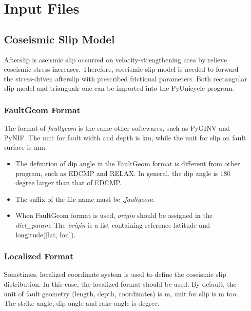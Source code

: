 \documentclass[UTF8,a4paper]{report}
\begin{document}
\chapter{Input Files}
\section{Coseismic Slip Model}
Afterslip is aseismic slip occurred on velocity-strengthening area by relieve coseismic stress increases. Therefore, coseismic slip model is needed to forward the stress-driven afterslip with prescribed frictional parameters. Both rectangular slip model and triangualr one can be imported into the PyUnicycle program.

\subsection{FaultGeom Format}
The format of \textit{faultgeom} is the same other softewares, such as PyGINV and PyNIF. The unit for fault width and depth is km, while the unit for slip on fault surface is mm.
\begin{center}
\end{center}

\begin{itemize}
\item The definition of dip angle in the FaultGeom format is different from other program, such as EDCMP and RELAX. In general, the dip angle is 180 degree larger than that of EDCMP.
\item The suffix of the file name must be \emph{.faultgeom}.
\item When FaultGeom format is used, \emph{origin} should be assigned in the \emph{dict\_param}. The \emph{origin} is a list containing reference latitude and longitude([lat, lon]).
\end{itemize}


\subsection{Localized Format}
Sometimes, localized coordinate system is used to define the coseismic slip distribution. In this case, the localized format should be used. By default, the unit of fault geometry (length, depth, coordinates) is m, unit for slip is m too. The strike angle, dip angle and rake angle is degree.
\begin{center}
\end{center}
\end{document}
